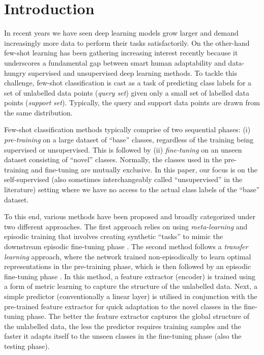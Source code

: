 \chapter{Introduction}\label{sec:intro}

In recent years we have seen deep learning models grow larger and demand increasingly more data to perform their tasks satisfactorily. 
On the other-hand few-shot learning has been gathering increasing interest recently because it underscores a fundamental gap between smart human adaptability and data-hungry supervised and unsupervised deep learning methods. To tackle this challenge, few-shot classification is cast as a task of predicting class labels for a set of unlabelled data points (\textit{query set}) given only a small set of labelled data points (\textit{support set}). Typically, the query and support data points are drawn from the same distribution. 

Few-shot classification methods typically comprise of two sequential phases: (i) \textit{pre-training} on a large dataset of ``base'' classes, regardless of the training being supervised or unsupervised. This is followed by (ii) \textit{fine-tuning} on an unseen dataset consisting of ``novel'' classes. Normally, the classes used in the pre-training and fine-tuning are mutually exclusive. In this paper, our focus is on the self-supervised (also sometimes interchangeably called ``unsupervised'' in the literature) setting where we have no access to the actual class labels of the ``base'' dataset.

To this end, various methods have been proposed and broadly categorized under two different approaches. The first approach relies on using \textit{meta-learning} and episodic training that involves creating synthetic ``tasks'' to mimic the downstream episodic fine-tuning phase \cite{Finn2017Model-agnosticNetworks, Hsu2018UnsupervisedMeta-Learning, Khodadadeh2018UnsupervisedClassification, Antoniou2019AssumeAugmentation, Ye2022, lee2021meta, Ji2019UnsupervisedTraining}. 
The second method follows a \textit{transfer learning} approach, where the network trained non-episodically to learn optimal representations in the pre-training phase, which is then followed by an episodic fine-tuning phase \cite{Medina2020Self-SupervisedClassification, goodemballneed2020, dhillon2019baseline}.
In this method, a feature extractor (encoder) is trained using a form of metric learning to capture the structure of the unlabelled data. 
Next, a simple predictor (conventionally a linear layer) is utilised in conjunction with the pre-trained feature extractor for quick adaptation to the novel classes in the fine-tuning phase.
The better the feature extractor captures the global structure of the unlabelled data, the less the predictor requires training samples and the faster it adapts itself to the unseen classes in the fine-tuning phase (also the testing phase).


